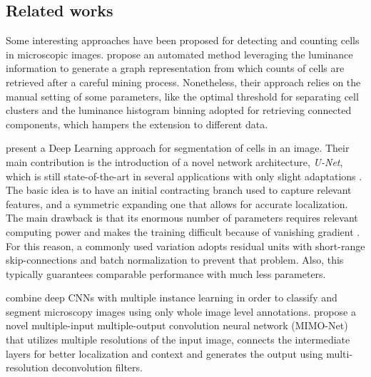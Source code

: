\subsection{Related works}
\label{sec:related_works}

Some interesting approaches have been proposed for detecting and counting cells in microscopic images.
 propose an automated method leveraging the luminance information to generate a graph representation from which counts of cells are retrieved after a careful mining process. Nonetheless, their approach relies on the manual setting of some parameters, like the optimal threshold for separating cell clusters and the luminance histogram binning adopted for retrieving connected components, which hampers the extension to different data.

 present a Deep Learning approach for segmentation of cells in an image. 
Their main contribution is the introduction of a novel network architecture, \textit{U-Net}, which is still state-of-the-art in several applications with only slight adaptations \cite{masin2021novel, ritch2020axonet}. 
The basic idea is to have an initial contracting branch used to capture relevant features, and a symmetric expanding one that allows for accurate localization.
The main drawback is that its enormous number of parameters requires relevant computing power and makes the training difficult because of vanishing gradient \cite{vanishing_gradient, denseUnet2d, cao2020denseunet, qamar2020variant}. 
For this reason, a commonly used variation adopts residual units \cite{residual_units} with short-range skip-connections and batch normalization to prevent that problem.
Also, this typically guarantees comparable performance with much less parameters.

 combine deep CNNs with multiple instance learning in order to classify and segment microscopy images using only whole image level annotations. 
 propose a novel multiple-input multiple-output convolution neural network (MIMO-Net) that utilizes multiple resolutions of the input image, connects the intermediate layers for better localization and context and generates the output using multi-resolution deconvolution filters.

